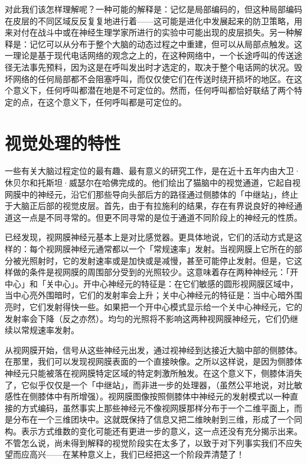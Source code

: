 \documentclass[
  12pt,
  twoside,
  openright,
  oldfontcommands,
]{memoir}
\begin{document}
对此我们该怎样理解呢？一种可能的解释是：记忆是局部编码的，但这种局部编码在皮层的不同区域反反复复地进行着------这可能是进化中发展起来的防卫策略，用来对付在战斗中或在神经生理学家所进行的实验中可能出现的皮层损失。另一种解释是：记忆可以从分布于整个大脑的动态过程之中重建，但可以从局部点触发。这一理论是基于现代电话网络的观念之上的，在这种网络中，一个长途呼叫的传送途径无法事先预料，因为这是在呼叫发出时才选定的，取决于整个电话网的状况。毁坏网络的任何局部都不会阻塞呼叫，而仅仅使它们在传送时绕开损坏的地区。在这个意义下，任何呼叫都潜在地是不可定位的。然而，任何呼叫都恰好联结了两个特定的点，在这个意义下，任何呼叫都是可定位的。

\section{视觉处理的特性}

一些有关大脑过程定位的最有趣、最有意义的研究工作，是在近十五年内由大卫·休贝尔和托斯坦·威瑟尔在哈佛完成的。他们绘出了猫脑中的视觉通道，它起自视网膜中的神经元，沿它们那些导向头部后方的路径通过侧膝体的「中继站」，终止于大脑正后部的视觉皮层。首先，由于有拉施利的结果，存在有界说良好的神经通道这一点是不同寻常的。但更不同寻常的是位于通道不同阶段上的神经元的性质。

已经发现，视网膜神经元基本上是对比感觉器。更具体地说，它们的活动方式是这样的：每个视网膜神经元通常都以一个「常规速率」发射。当视网膜上它所在的部分被光照射时，它的发射速率或是加快或是减慢，甚至可能停止发射。但是，它这样做的条件是视网膜的周围部分受到的光照较少。这意味着存在两种神经元：「开中心」和「关中心」。开中心神经元的特征是：在它们敏感的圆形视网膜区域中，当中心亮外围暗时，它们的发射率会上升；关中心神经元的特征是：当中心暗外围亮时，它们发射得快一些。如果把一个开中心模式显示给一个关中心神经元，它的发射率会下降（反之亦然）。均匀的光照将不影响这两种视网膜神经元，它们仍继续以常规速率发射。

从视网膜开始，信号从这些神经元出发，通过视神经到达接近大脑中部的侧膝体。在那里，我们可以发现视网膜表面的一个直接映像。之所以这样说，是因为侧膝体神经元只能被落在视网膜特定区域的特定刺激所触发。在这个意义下，侧膝体消失了，它似乎仅仅是一个「中继站」，而非进一步的处理器，（虽然公平地说，对比敏感性在侧膝体中有所增强）。视网膜图像按照侧膝体中神经元的发射模式以一种直接的方式编码，虽然事实上那些神经元不像视网膜那样分布于一个二维平面上，而是分布在一个三维团块中。这就既保持了信息又把二维映射到三维，形成了一个同构。表示方式维数的变化可能还有更进一步的意义，这一点还没有充分揭示出来。不管怎么说，尚未得到解释的视觉阶段实在太多了，以致于对下列事实我们不应失望而应高兴------在某种意义上，我们已经把这一个阶段弄清楚了！
\end{document}
